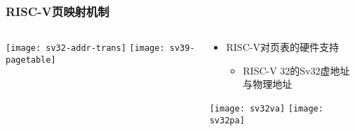 \begin{frame}   
	\frametitle{RISC-V页映射机制}
	
	\begin{columns}[t]
		
		\begin{column}{.4\textwidth}
			
			\centering
			\texttt{[image: sv32-addr-trans]}
			\texttt{[image: sv39-pagetable]}
			
		\end{column}
		
		
		\begin{column}{.6\textwidth}
			
			\begin{itemize}\large
				\item RISC-V对页表的硬件支持
				\begin{itemize}
					\item RISC-V 32的Sv32虚地址与物理地址
					
					
				\end{itemize}
			\end{itemize}
			
			\texttt{[image: sv32va]} \pause
			\texttt{[image: sv32pa]}
			
		\end{column}
		
		
	\end{columns}
	
\end{frame}

